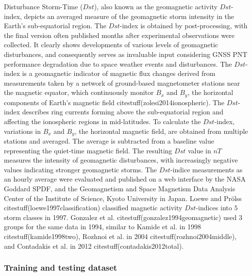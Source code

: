 \let\LaTeXcline\cline\documentclass[sn-mathphys-num]{sn-jnl}\let\cline\LaTeXcline
\begin{document}
Disturbance Storm-Time ($Dst$), also known as the geomagnetic activity $Dst$-index, depicts an averaged measure of the geomagnetic storm intensity in the Earth's sub-equatorial region. The $Dst$-index is obtained by post-processing, with the final version often published months after experimental observations were collected. It clearly shows developments of various levels of geomagnetic disturbances, and consequently serves as invaluable input considering GNSS PNT performance degradation due to space weather events and disturbances. The $Dst$-index is a geomagnetic indicator of magnetic flux changes derived from measurements taken by a network of ground-based magnetometer stations near the magnetic equator, which continuously monitor $B_{x}$ and $B_{y}$, the horizontal components of Earth's magnetic field citestuff(zolesi2014ionospheric). The $Dst$-index describes ring currents forming above the sub-equatorial region and affecting the ionospheric regions in mid-latitudes. To calculate the $Dst$-index, variations in $B_{x}$ and $B_{y}$, the horizontal magnetic field, are obtained from multiple stations and averaged. The average is subtracted from a baseline value representing the quiet-time magnetic field. The resulting $Dst$ value in $nT$ measures the intensity of geomagnetic disturbances, with increasingly negative values indicating stronger geomagnetic storms. The $Dst$-indice measurements as an hourly average were evaluated and published on a web interface by the NASA Goddard SPDF, and the Geomagnetism and Space Magnetism Data Analysis Center of the Institute of Science, Kyoto University in Japan. Loewe and Prölss citestuff(loewe1997classification) classified magnetic activity $Dst$-indices into $5$ storm classes in 1997. Gonzalez et al. citestuff(gonzalez1994geomagnetic) used $3$ groups for the same data in 1994, similar to Kamide et al. in 1998 citestuff(kamide1998two), Rozhnoi et al. in 2004 citestuff(rozhnoi2004middle), and Contadakis et al. in 2012 citestuff(contadakis2012total).

\subsubsection{Training and testing dataset}
\end{document}
